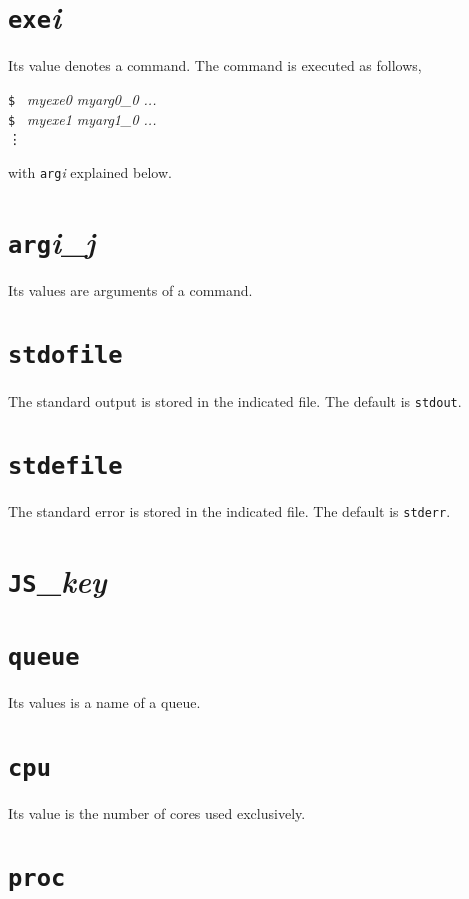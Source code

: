 \documentclass[a4paper,10pt]{report}
\begin{document}
\section{\texttt{exe}\textit{i}}

Its value denotes a command.  The command is executed as follows,
\begin{screen}
\texttt{\$ } \textit{myexe0 myarg0\_0 ...}\\
\texttt{\$ } \textit{myexe1 myarg1\_0 ...}\\
\vdots
\end{screen}
with \texttt{arg}\textit{i} explained below.

\section{\texttt{arg}\textit{i}\_\textit{j}}

Its values are arguments of a command.

\section{\texttt{stdofile}}

The standard output is stored in the indicated file.
The default is \texttt{stdout}.

\section{\texttt{stdefile}}

The standard error is stored in the indicated file.
The default is \texttt{stderr}.

\section{\texttt{JS}\_\textit{key}}

\section{\texttt{queue}}

Its values is a name of a queue.

\section{\texttt{cpu}}

Its value is the number of cores used exclusively.

\section{\texttt{proc}}
\end{document}
